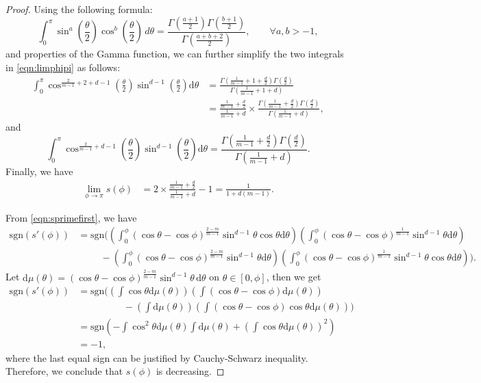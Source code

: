 \documentclass[11pt]{amsart}
\def\d{\mathrm{d}}
\newcommand{\dm}{d} %
\begin{document}
\begin{proof}
Using the following formula:
\[
\int_0^\pi
\sin^a\left(\frac{\theta}{2}\right)
\cos^b\left(\frac{\theta}{2}\right)\,d\theta
=
\frac{
\Gamma\left(\frac{a+1}{2}\right)
\Gamma\left(\frac{b+1}{2}\right)
}{
\Gamma\left(\frac{a+b+2}{2}\right)}, \qquad\forall a, b>-1,
\] 
and properties of the Gamma function, we can further simplify the two integrals in \eqref{eqn:limphipi} as follows:
\begin{align*}
\int_0^\pi \cos^{\frac{2}{m-1}+2+\dm-1}\left(\frac{\theta}{2}\right)\sin^{\dm-1}\left(\frac{\theta}{2}\right)\d\theta &=\frac{\Gamma\left(\frac{1}{m-1}+1+\frac{\dm}{2}\right)\Gamma\left(\frac{\dm}{2}\right)}{\Gamma\left(\frac{1}{m-1}+1+\dm\right)}\\
&=\frac{\frac{1}{m-1}+\frac{\dm}{2}}{\frac{1}{m-1}+\dm}\times \frac{\Gamma\left(\frac{1}{m-1}+\frac{\dm}{2}\right)\Gamma\left(\frac{\dm}{2}\right)}{\Gamma\left(\frac{1}{m-1}+\dm\right)},
\end{align*}
and
\[
\int_0^\pi \cos^{\frac{2}{m-1}+\dm-1}\left(\frac{\theta}{2}\right)\sin^{\dm-1}\left(\frac{\theta}{2}\right)\d\theta=\frac{\Gamma\left(\frac{1}{m-1}+\frac{\dm}{2}\right)\Gamma\left(\frac{\dm}{2}\right)}{\Gamma\left(\frac{1}{m-1}+\dm\right)}.
\]
Finally, we have
\begin{align*}
\lim_{\phi\to\pi}s(\phi)&=2\times\frac{\frac{1}{m-1}+\frac{\dm}{2}}{\frac{1}{m-1}+\dm}-1=\frac{1}{1+\dm(m-1)}.
\end{align*}
\medskip

 From \eqref{eqn:sprimefirst}, we have 
\begin{align*}
\mathrm{sgn}(s'(\phi))&=\mathrm{sgn}\bigg(
\left(\int_0^\phi(\cos\theta-\cos\phi)^{\frac{2-m}{m-1}}\sin^{\dm-1}\theta\cos\theta\d\theta\right)\left(\int_0^\phi(\cos\theta-\cos\phi)^{\frac{1}{m-1}}\sin^{\dm-1}\theta\d\theta\right)\\
&\hspace{1cm}-\left(\int_0^\phi(\cos\theta-\cos\phi)^{\frac{2-m}{m-1}}\sin^{\dm-1}\theta\d\theta\right)\left(\int_0^\phi(\cos\theta-\cos\phi)^{\frac{1}{m-1}}\sin^{\dm-1}\theta\cos\theta\d\theta\right)
\bigg).
\end{align*}
Let $\d\mu(\theta)=(\cos\theta-\cos\phi)^{\frac{2-m}{m-1}}\sin^{\dm-1}\theta \, \d\theta$ on $\theta\in[0, \phi]$, then we get
\begin{align*}
\mathrm{sgn}(s'(\phi))&=\mathrm{sgn}\bigg(
\left(\int\cos\theta\d\mu(\theta)\right)\left(\int(\cos\theta-\cos\phi)\d\mu(\theta)\right)\\
&\hspace{2cm}-\left(\int\d\mu(\theta)\right)\left(\int(\cos\theta-\cos\phi)\cos\theta\d\mu(\theta)\right)
\bigg)\\
&=\mathrm{sgn}\left(-\int\cos^2\theta\d\mu(\theta)\int\d\mu(\theta)+\left(\int\cos\theta\d\mu(\theta)\right)^2\right)\\
&=-1,
\end{align*}
where the last equal sign can be justified by Cauchy-Schwarz inequality. Therefore, we conclude that $s(\phi)$ is decreasing.
\end{proof}
\end{document}
